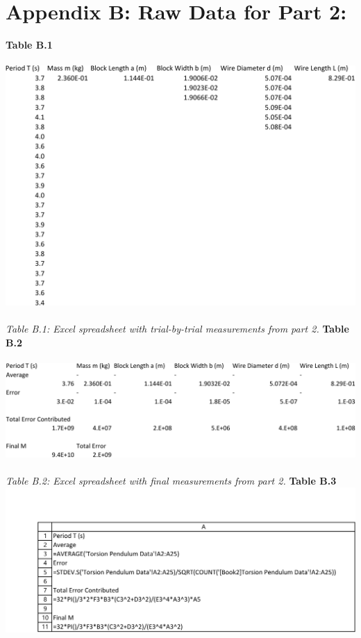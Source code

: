 \documentclass[leqno]{article}
\begin{document}
\section*{Appendix B: Raw Data for Part 2:}
\noindent
\textbf{Table B.1}\\\\
\includegraphics[width=\linewidth]{lab1datab-crop}\\\\
\textit{\small Table B.1: Excel spreadsheet with trial-by-trial measurements from part 2.}
\newpage
\noindent\textbf{Table B.2}\\\\
\includegraphics[width=\linewidth]{lab1datac-crop}\\\\
\textit{\small Table B.2: Excel spreadsheet with final measurements from part 2.}
\newpage
\textbf{Table B.3}\\
\includegraphics[width=\linewidth]{lab1datacf1-crop}
\end{document}
